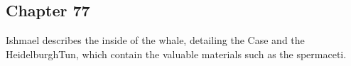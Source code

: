 \subsection{Chapter 77}

Ishmael describes the inside of the whale, detailing the Case and the
HeidelburghTun, which contain the valuable materials such as the spermaceti.
